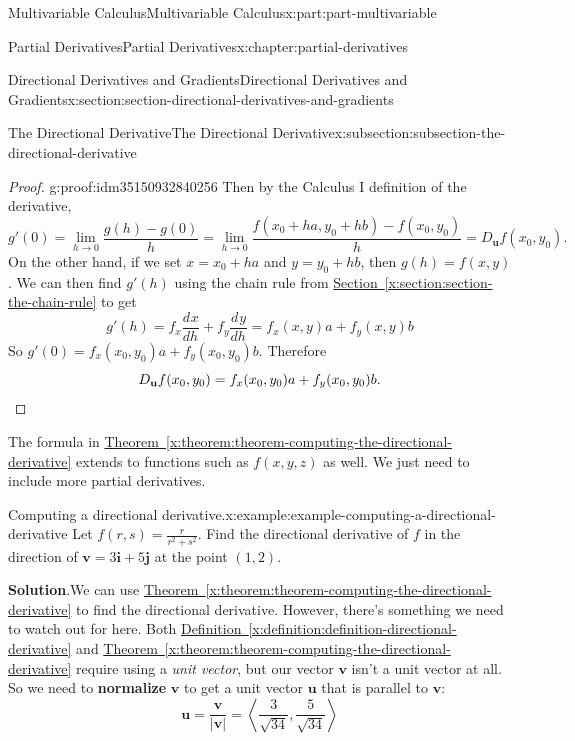 \documentclass[twoside,10pt,]{tufte-book}
\newcommand{\blocktitlefont}{\relax}
\newcommand{\xreffont}{\relax}
\newcommand{\terminology}[1]{\textbf{#1}}
\numberwithin{equation}{part}
\newcommand{\qedhere}{\relax}
\newcommand{\vb}[1]{\mathbf{#1}}
\newcommand{\dv}[3][]{\dfrac{d^{#1} #2}{d #3^{#1}}}
\newcommand{\dotprod}[1]{\left\langle #1 \right\rangle}
\begin{document}
\begin{partptx}{Multivariable Calculus}{}{Multivariable Calculus}{}{}{x:part:part-multivariable}
\begin{chapterptx}{Partial Derivatives}{}{Partial Derivatives}{}{}{x:chapter:partial-derivatives}
\begin{sectionptx}{Directional Derivatives and Gradients}{}{Directional Derivatives and Gradients}{}{}{x:section:section-directional-derivatives-and-gradients}
\begin{subsectionptx}{The Directional Derivative}{}{The Directional Derivative}{}{}{x:subsection:subsection-the-directional-derivative}
\begin{proof}{}{g:proof:idm35150932840256}
Then by the Calculus I definition of the derivative,%
\begin{equation*}
g'(0) = \lim_{h\to0}\frac{g(h) - g(0)}{h} = \lim_{h\to0}\frac{f(x_{0}+ha, y_{0}+hb) - f(x_{0},y_{0})}{h} = D_{\vb{u}}f(x_{0},y_{0}).
\end{equation*}
On the other hand, if we set \(x = x_{0} + ha\) and \(y = y_{0} + hb\), then \(g(h) = f(x,y)\). We can then find \(g'(h)\) using the chain rule from \hyperref[x:section:section-the-chain-rule]{Section~{\xreffont\ref{x:section:section-the-chain-rule}}} to get%
\begin{equation*}
g'(h) = f_{x}\dv{x}{h} + f_{y}\dv{y}{h} = f_{x}(x,y)a + f_{y}(x,y)b
\end{equation*}
So \(g'(0) = f_{x}(x_{0},y_{0})a + f_{y}(x_{0},y_{0})b.\) Therefore%
\begin{equation*}
D_{\vb{u}}f(x_{0},y_{0}) = f_{x}(x_{0},y_{0})a + f_{y}(x_{0},y_{0})b.\qedhere
\end{equation*}
%
\end{proof}
The formula in \hyperref[x:theorem:theorem-computing-the-directional-derivative]{Theorem~{\xreffont\ref{x:theorem:theorem-computing-the-directional-derivative}}} extends to functions such as \(f(x,y,z)\) as well. We just need to include more partial derivatives.%
\begin{example}{Computing a directional derivative.}{x:example:example-computing-a-directional-derivative}%
Let \(f(r,s) = \frac{r}{r^{2}+s^{2}}\). Find the directional derivative of \(f\) in the direction of \(\vb{v} = 3\vb{i} + 5\vb{j}\) at the point \((1,2)\).%
\par\smallskip%
\noindent\textbf{\blocktitlefont Solution}.\hypertarget{g:solution:idm35150932635584}{}\quad{}We can use \hyperref[x:theorem:theorem-computing-the-directional-derivative]{Theorem~{\xreffont\ref{x:theorem:theorem-computing-the-directional-derivative}}} to find the directional derivative. However, there's something we need to watch out for here. Both \hyperref[x:definition:definition-directional-derivative]{Definition~{\xreffont\ref{x:definition:definition-directional-derivative}}} and \hyperref[x:theorem:theorem-computing-the-directional-derivative]{Theorem~{\xreffont\ref{x:theorem:theorem-computing-the-directional-derivative}}} require using a \emph{unit vector}, but our vector \(\vb{v}\) isn't a unit vector at all. So we need to \terminology{normalize} \(\vb{v}\) to get a unit vector \(\vb{u}\) that is parallel to \(\vb{v}\):%
\begin{equation*}
\vb{u} = \frac{\vb{v}}{|\vb{v}|} = \dotprod{\frac{3}{\sqrt{34}}, \frac{5}{\sqrt{34}}}

\end{equation*}
\end{example}
\end{subsectionptx}
\end{sectionptx}
\end{chapterptx}
\end{partptx}
\end{document}
